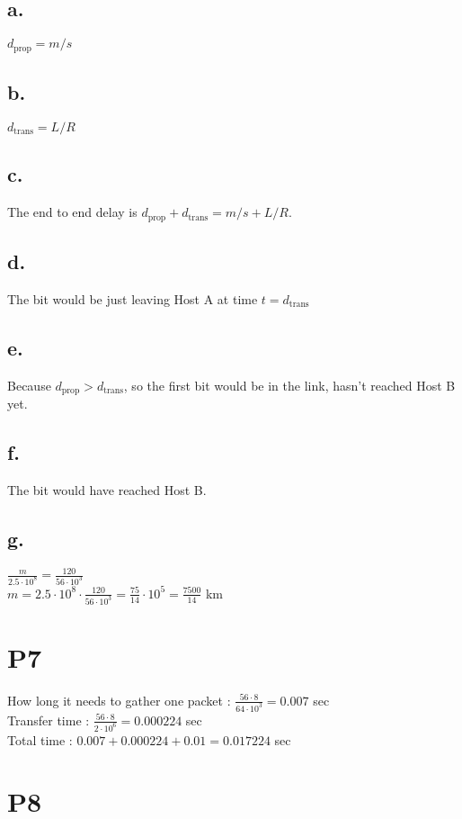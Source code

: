 \documentclass[11pt,a4paper]{article}
\begin{document}
\subsection{a.}
$d_{\text{prop}} = m / s $

\subsection{b.}
$d_{\text{trans}} = L / R$

\subsection{c.}
The end to end delay is $d_{\text{prop}} + d_{\text{trans}} =  m / s + L / R$.

\subsection{d.}
The bit would be just leaving Host A at time $t = d_{\text{trans}}$

\subsection{e.}
Because $d_{\text{prop}} > d_{\text{trans}}$, so the first bit would be in the link, hasn't reached Host B yet.

\subsection{f.}
The bit would have reached Host B.

\subsection{g.}
$\frac{m}{2.5 \cdot 10^8} = \frac{120}{56 \cdot 10^3}$ \\
$m = 2.5 \cdot 10^8 \cdot \frac{120}{56 \cdot 10^3} = \frac{75}{14} \cdot 10^5 = \frac{7500}{14}$ km

\section{P7}
How long it needs to gather one packet : $\frac{56 \cdot 8}{64 \cdot 10^3} = 0.007$ sec \\
Transfer time : $\frac{56 \cdot 8}{2 \cdot 10^6} = 0.000224$ sec \\
Total time : $0.007 + 0.000224 + 0.01 = 0.017224$ sec 

\section{P8}
\end{document}
